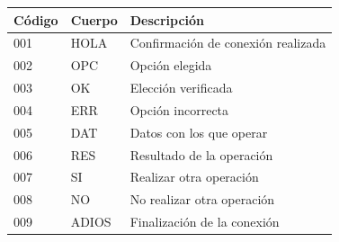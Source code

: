 \documentclass[a4paper, 11pt]{article}
\theoremstyle{plain}
\begin{document}
\begin{table}[]
\centering
\label{my-label}
\begin{tabular}{lll}
\hline
\multicolumn{1}{|l|}{Código} & \multicolumn{1}{l|}{Cuerpo} & \multicolumn{1}{l|}{Descripción}   \\ \hline
001                          & HOLA                        & Confirmación de conexión realizada \\
002                          & OPC                         & Opción elegida                     \\
003                          & OK                          & Elección verificada                \\
004                          & ERR                         & Opción incorrecta                  \\
005                          & DAT                         & Datos con los que operar           \\
006                          & RES                         & Resultado de la operación          \\
007                          & SI                          & Realizar otra operación            \\
008                          & NO                          & No realizar otra operación         \\
009                          & ADIOS                       & Finalización de la conexión       
\end{tabular}
\end{table}
\end{document}
